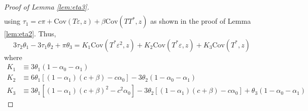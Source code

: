 \documentclass[12pt]{article}
\begin{document}
\begin{proof}[Proof of Lemma \ref{lem:eta3}]
\begin{align*}
\end{align*}
using $\tau_1 = c\pi + \mbox{Cov}(T\varepsilon,z) + \beta\mbox{Cov}(TT^*,z)$ as shown in the proof of Lemma \ref{lem:eta2}.
Thus, 
\[
  3\tau_2 \theta_1 - 3 \tau_1 \theta_2 + \pi \theta_3 = K_1 \mbox{Cov}(T^*\varepsilon^2,z) + K_2 \mbox{Cov}(T^*\varepsilon, z) + K_3 \mbox{Cov}(T^*,z)
\]
where
\begin{align*}
  K_1 &\equiv 3 \theta_1(1 - \alpha_0 - \alpha_1)\\ 
  K_2 &\equiv 6\theta_1 \left[(1 - \alpha_1)(c +\beta) - c\alpha_0\right] - 3\theta_2 (1 - \alpha_0 - \alpha_1) \\
  K_3 &\equiv 3\theta_1 \left[ (1 - \alpha_1)(c + \beta)^2 - c^2 \alpha_0 \right] - 3\theta_2 \left[ (1 - \alpha_1)(c + \beta) - c\alpha_0 \right] + \theta_3(1 - \alpha_0 - \alpha_1)

\end{align*}
\end{proof}
\end{document}
